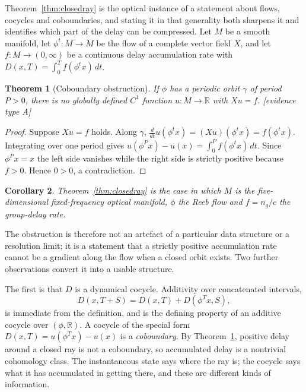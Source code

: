 \documentclass[11pt]{article}
\newtheorem{theorem}{Theorem}
\newtheorem{corollary}[theorem]{Corollary}
\begin{document}
Theorem~\ref{thm:closedray} is the optical instance of a statement about flows,
cocycles and coboundaries, and stating it in that generality both sharpens it and
identifies which part of the delay can be compressed. Let $M$ be a smooth manifold, let
$\phi^t:M\to M$ be the flow of a complete vector field $X$, and let
$f:M\to(0,\infty)$ be a continuous delay accumulation rate with
$D(x,T)=\int_0^T f(\phi^t x)\,dt$.

\begin{theorem}[Coboundary obstruction]\label{thm:coboundary}
If $\phi$ has a periodic orbit $\gamma$ of period $P>0$, there is no globally defined
$C^1$ function $u:M\to\mathbb{R}$ with $Xu=f$. [evidence type A]
\end{theorem}
\begin{proof}
Suppose $Xu=f$ holds. Along $\gamma$,
$\tfrac{d}{dt}u(\phi^t x)=(Xu)(\phi^t x)=f(\phi^t x)$. Integrating over one period gives
$u(\phi^P x)-u(x)=\int_0^P f(\phi^t x)\,dt$. Since $\phi^P x=x$ the left side vanishes
while the right side is strictly positive because $f>0$. Hence $0>0$, a contradiction.
\end{proof}

\begin{corollary}\label{cor:optical}
Theorem~\ref{thm:closedray} is the case in which $M$ is the five-dimensional
fixed-frequency optical manifold, $\phi$ the Reeb flow and $f=n_g/c$ the group-delay rate.
\end{corollary}

The obstruction is therefore not an artefact of a particular data structure or a
resolution limit; it is a statement that a strictly positive accumulation rate cannot be
a gradient along the flow when a closed orbit exists. Two further observations convert it
into a usable structure.

The first is that $D$ is a dynamical cocycle. Additivity over concatenated intervals,
\begin{equation}
D(x,T+S) = D(x,T) + D\!\left(\phi^T x, S\right),
\end{equation}
is immediate from the definition, and is the defining property of an additive cocycle over
$(\phi,\mathbb{R})$. A cocycle of the special form
$D(x,T)=u(\phi^T x)-u(x)$ is a \emph{coboundary}. By Theorem~\ref{thm:coboundary}, positive
delay around a closed ray is not a coboundary, so accumulated delay is a nontrivial
cohomology class. The instantaneous state says where the ray is; the cocycle says what it
has accumulated in getting there, and these are different kinds of information.
\end{document}
